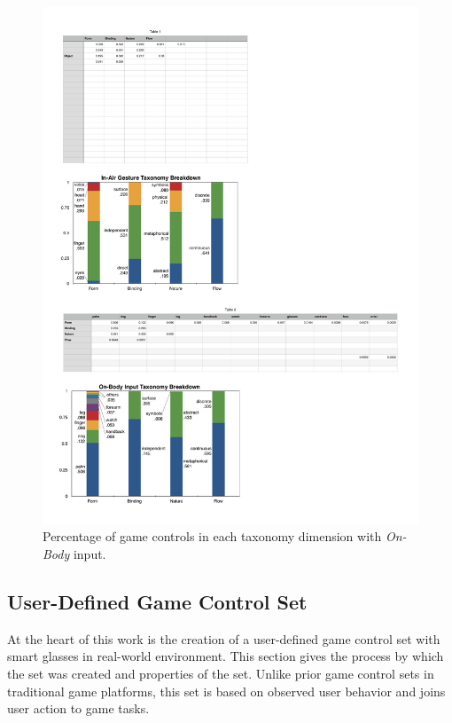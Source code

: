 \documentclass{sigchi}
\begin{document}
 \begin{figure}[!h]
  \centering
  \includegraphics[width=1\columnwidth]{OnbodyTaxonomy.pdf}
  \caption{Percentage of game controls in each taxonomy dimension with \emph{On-Body} input.}
  \label{fig:OnbodyTaxonomy}
  \end{figure} 

  \subsection{User-Defined Game Control Set}
  At the heart of this work is the creation of a user-defined game control set with smart glasses in real-world environment. This section gives the process by which the set was created and properties of the set. Unlike prior game control sets in traditional game platforms, this set is based on observed user behavior and joins user action to game tasks.
\end{document}
